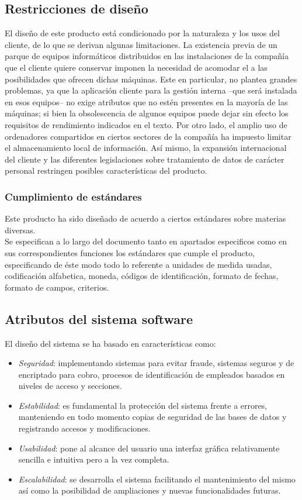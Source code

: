 \documentclass[11pt, a4paper, twoside, titlepage]{article}
\begin{document}
		\subsection{Restricciones de diseño}
			El diseño de este producto está condicionado por la naturaleza y los usos del cliente, de lo que se derivan algunas limitaciones. La existencia previa de un parque de equipos informáticos distribuidos en las instalaciones de la compañía que el cliente quiere conservar imponen la necesidad de acomodar el \software a las posibilidades que ofrecen dichas máquinas. Este en particular, no plantea grandes problemas, ya que la aplicación cliente para la gestión interna --que será instalada en esos equipos-- no exige atributos que no estén presentes en la mayoría de las máquinas; si bien la obsolescencia de algunos equipos puede dejar sin efecto los requisitos de rendimiento indicados en el texto. Por otro lado, el amplio uso de ordenadores compartidos en ciertos sectores de la compañía ha impuesto limitar el almacenamiento local de información. Así mismo, la expansión internacional del cliente y las diferentes legislaciones sobre tratamiento de datos de carácter personal restringen posibles características del producto.
			\subsubsection{Cumplimiento de estándares} %
				Este producto ha sido diseñado de acuerdo a ciertos estándares sobre materias diversas.\\
				
				Se especifican a lo largo del documento tanto en apartados especificos como en sus correspondientes funciones los estándares que cumple el producto, especificando de éste modo todo lo referente a unidades de medida usadas, codificación alfabetica, moneda, códigos de identificación, formato de fechas, formato de campos, criterios.
		\subsection{Atributos del sistema software}
			El diseño del sistema se ha basado en características como:
			\begin{itemize}
				\item \textit{Seguridad}: implementando sistemas para evitar fraude, sistemas seguros y de encriptado para cobro, procesos de identificación de empleados basados en niveles de acceso y secciones.
				\item \textit{Estabilidad}: es fundamental la protección del sistema frente a errores, manteniendo en todo momento copias de seguridad de las bases de datos y registrando accesos y modificaciones.
				\item \textit{\gls{Usabilidad}}: pone al alcance del usuario una interfaz gráfica relativamente sencilla e intuitiva pero a la vez completa.
				\item \textit{Escalabilidad}: se desarrolla el sistema facilitando el mantenimiento del mismo así como la posibilidad de ampliaciones y nuevas funcionalidades futuras.
			\end{itemize}
	
\end{document}
